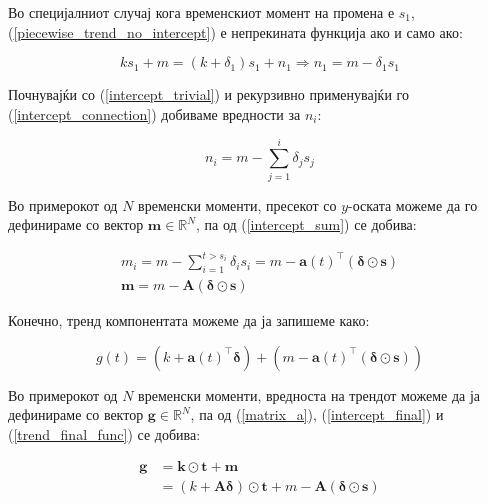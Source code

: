 \documentclass[12pt]{article}
\numberwithin{equation}{section}
\begin{document}
Во специјалниот случај кога временскиот момент на промена е \(s_1\), (\ref{piecewise_trend_no_intercept}) е непрекината функција ако и само ако:

\begin{equation}\label{intercept_trivial}
ks_1 + m = (k + \delta_1)s_1 + n_1 \Rightarrow n_1 = m - \delta_1s_1
\end{equation}

Почнувајќи со (\ref{intercept_trivial}) и рекурзивно применувајќи го (\ref{intercept_connection}) добиваме вредности за \(n_i\):

\begin{equation}\label{intercept_sum}
    n_i = m - \sum_{j=1}^{i} \delta_js_j
\end{equation}

Во примерокот од \(N\) временски моменти, пресекот со \(y\)-оската можеме да го дефинираме со вектор \(\boldsymbol{m} \in \mathbb{R}^N\), па од (\ref{intercept_sum}) се добива:

\begin{equation}\label{intercept_final}
    \begin{gathered}
        m_i = m - \sum_{i=1}^{t>s_i} \delta_is_i = m - \boldsymbol{a}(t)^{\top}(\boldsymbol{\delta}\odot\boldsymbol{s}) \\
        \boldsymbol{m} = m - \boldsymbol{A}(\boldsymbol{\delta}\odot\boldsymbol{s})
    \end{gathered}
\end{equation}

Конечно, тренд компонентата можеме да ја запишеме како:

\begin{equation}\label{trend_final_func}
    g(t) = (k + \boldsymbol{a}(t)^{\top}\boldsymbol{\delta}) + (m - \boldsymbol{a}(t)^{\top}(\boldsymbol{\delta}\odot\boldsymbol{s}))
\end{equation}

Во примерокот од \(N\) временски моменти,  вредноста на трендот можеме да ја дефинираме со вектор \(\boldsymbol{g} \in \mathbb{R}^N\), па од (\ref{matrix_a}), (\ref{intercept_final}) и (\ref{trend_final_func}) се добива:

\begin{equation}\label{trend_final_vectorized}
    \begin{aligned}
        \boldsymbol{g} & = \boldsymbol{k} \odot \boldsymbol{t} + \boldsymbol{m} \\
        &=(k + \boldsymbol{A}\boldsymbol{\delta}) \odot \boldsymbol{t} + m - \boldsymbol{A}(\boldsymbol{\delta}\odot\boldsymbol{s})
    \end{aligned}
\end{equation}
\end{document}
